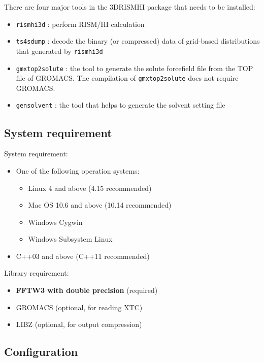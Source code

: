 \documentclass[aip,amsmath,amssymb,reprint,onecolumn]{revtex4-1}
\begin{document}
There are four major tools in the 3DRISMHI package that needs to be installed:

\begin{itemize}
    \item \texttt{rismhi3d} : perform RISM/HI calculation
    \item \texttt{ts4sdump} : decode the binary (or compressed) data of grid-based distributions that generated by \texttt{rismhi3d}
    \item \texttt{gmxtop2solute} : the tool to generate the solute forcefield file from the TOP file of GROMACS. The compilation of \texttt{gmxtop2solute} does not require GROMACS.
    \item \texttt{gensolvent} : the tool that helps to generate the solvent setting file
\end{itemize}

\subsection{System requirement}

System requirement:

\begin{itemize}
    \item One of the following operation systems:
    \begin{itemize}
        \item Linux 4 and above (4.15 recommended)
        \item Mac OS 10.6 and above (10.14 recommended)
        \item Windows Cygwin
        \item Windows Subsystem Linux
    \end{itemize}
    \item C++03 and above (C++11 recommended)
\end{itemize}

Library requirement:

\begin{itemize}
    \item {\bf FFTW3 with double precision} (required)
    \item GROMACS (optional, for reading XTC)
    \item LIBZ (optional, for output compression)
\end{itemize}

\subsection{Configuration}
\end{document}
